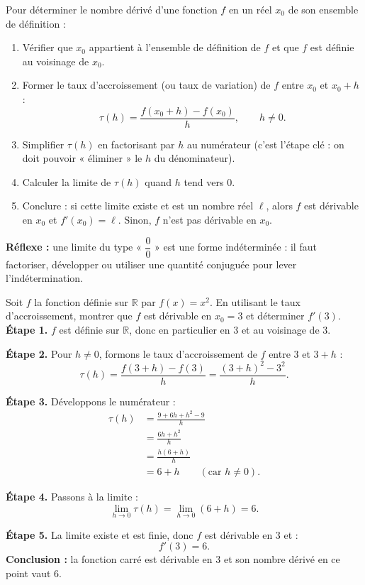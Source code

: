 \documentclass[11pt]{article}
\newcommand{\cle}[1]{{\popxbold\color{popdark}#1}}
\begin{document}
\begin{methode}
Pour déterminer le nombre dérivé d'une fonction $f$ en un réel $x_0$ de son ensemble de définition :
\begin{enumerate}
\item Vérifier que $x_0$ appartient à l'ensemble de définition de $f$ et que $f$ est définie au voisinage de $x_0$.
\item Former le \cle{taux d'accroissement} (ou taux de variation) de $f$ entre $x_0$ et $x_0+h$ :
\[ \tau(h)=\frac{f(x_0+h)-f(x_0)}{h}, \qquad h\neq 0. \]
\item Simplifier $\tau(h)$ en factorisant par $h$ au numérateur (c'est l'étape clé : on doit pouvoir « éliminer » le $h$ du dénominateur).
\item Calculer la limite de $\tau(h)$ quand $h$ tend vers $0$.
\item Conclure : si cette limite existe et est un nombre réel $\ell$, alors $f$ est \cle{dérivable} en $x_0$ et $f'(x_0)=\ell$. Sinon, $f$ n'est pas dérivable en $x_0$.
\end{enumerate}
\textbf{Réflexe :} une limite du type « $\dfrac{0}{0}$ » est une forme indéterminée : il faut factoriser, développer ou utiliser une quantité conjuguée pour lever l'indétermination.
\end{methode}

\begin{exoresolu}[Nombre dérivé de la fonction carré en $x_0=3$]
Soit $f$ la fonction définie sur $\mathbb{R}$ par $f(x)=x^2$. En utilisant le taux d'accroissement, montrer que $f$ est dérivable en $x_0=3$ et déterminer $f'(3)$.
\tcblower
\textbf{Étape 1.} $f$ est définie sur $\mathbb{R}$, donc en particulier en $3$ et au voisinage de $3$.

\textbf{Étape 2.} Pour $h\neq 0$, formons le taux d'accroissement de $f$ entre $3$ et $3+h$ :
\[ \tau(h)=\frac{f(3+h)-f(3)}{h}=\frac{(3+h)^2-3^2}{h}. \]

\textbf{Étape 3.} Développons le numérateur :
\begin{align*}
\tau(h) &= \frac{9+6h+h^2-9}{h} \\
&= \frac{6h+h^2}{h} \\
&= \frac{h(6+h)}{h} \\
&= 6+h \qquad (\text{car } h\neq 0).
\end{align*}

\textbf{Étape 4.} Passons à la limite :
\[ \lim_{h\to 0}\tau(h)=\lim_{h\to 0}(6+h)=6. \]

\textbf{Étape 5.} La limite existe et est finie, donc $f$ est dérivable en $3$ et :
\[ \boxed{f'(3)=6.} \]
\textbf{Conclusion :} la fonction carré est dérivable en $3$ et son nombre dérivé en ce point vaut $6$.
\end{exoresolu}
\end{document}
